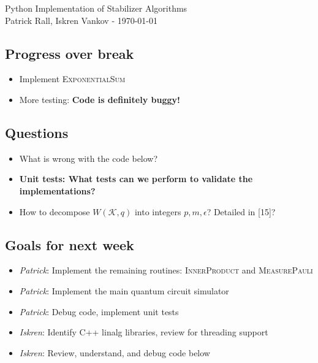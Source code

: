 \documentclass[11pt]{article}
\begin{document}
\begin{center}
    {\LARGE Python Implementation of Stabilizer Algorithms }
\vspace{2mm}
{\large \\ Patrick Rall, Iskren Vankov - \today}
\end{center}

\newenvironment{Figure}
  {\par\medskip\noindent\minipage{\linewidth}}
  {\endminipage\par\medskip}


\subsection*{Progress over break}
\begin{itemize}
    \item Implement \textsc{ExponentialSum}
    \item More testing: \textbf{Code is definitely buggy!}
\end{itemize}

\subsection*{Questions}
\begin{itemize}
    \item What is wrong with the code below?
    \item \textbf{Unit tests: What tests can we perform to validate the implementations?}
    \item How to decompose $W(\mathcal{K},q)$ into integers $p,m,\epsilon$? Detailed in [15]?
\end{itemize}

\subsection*{Goals for next week}
\begin{itemize}
    \item \textit{Patrick}: Implement the remaining routines: \textsc{InnerProduct} and \textsc{MeasurePauli}
    \item \textit{Patrick}: Implement the main quantum circuit simulator
    \item \textit{Patrick}: Debug code, implement unit tests
    \item \textit{Iskren}: Identify C++ linalg libraries, review for threading support
    \item \textit{Iskren}: Review, understand, and debug code below
\end{itemize}
\end{document}
